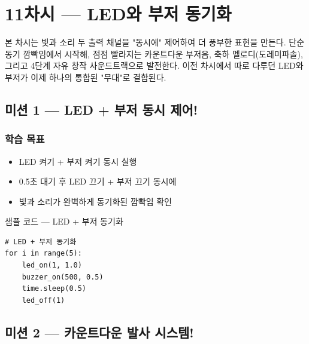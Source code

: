 \section{11차시 --- LED와 부저 동기화}
\label{sec:ch11}

본 차시는 빛과 소리 두 출력 채널을 "동시에" 제어하여 더 풍부한 표현을
만든다. 단순 동기 깜빡임에서 시작해, 점점 빨라지는 카운트다운 부저음,
축하 멜로디(도레미파솔), 그리고 4단계 자유 창작 사운드트랙으로 발전한다.
이전 차시에서 따로 다루던 LED와 부저가 이제 하나의 통합된 "무대"로
결합된다.

\subsection{미션 1 --- LED + 부저 동시 제어!}
\label{subsec:ch11-m1}

\begin{storybox}
\end{storybox}

\subsubsection*{학습 목표}
\begin{itemize}[leftmargin=1.4em]
  \item LED 켜기 + 부저 켜기 동시 실행
  \item 0.5초 대기 후 LED 끄기 + 부저 끄기 동시에
  \item 빛과 소리가 완벽하게 동기화된 깜빡임 확인
\end{itemize}

\begin{labbox}{샘플 코드 --- LED + 부저 동기화}
\begin{verbatim}
# LED + 부저 동기화
for i in range(5):
    led_on(1, 1.0)
    buzzer_on(500, 0.5)
    time.sleep(0.5)
    led_off(1)
\end{verbatim}
\end{labbox}

\subsection{미션 2 --- 카운트다운 발사 시스템!}
\label{subsec:ch11-m2}

\begin{storybox}
\end{storybox}

